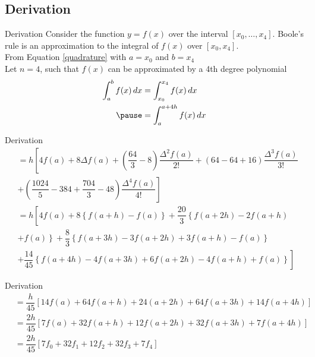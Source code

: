 \documentclass{beamer}
\begin{document}
\subsection{Derivation \cite{booles_quadrature}}

\begin{frame}{Derivation}
  Consider the function $y = f(x)$ over the interval $[x_0,\dots,x_4]$. Boole's rule is an approximation to the integral of $f(x)$ over $[x_0,x_4]$. \\ \pause 
  From Equation \ref{quadrature} with $a = x_0$ and $b = x_4$ \\ \pause 
  Let $n = 4$, such that $f(x)$ can be approximated by a 4th degree polynomial \\
  \begin{equation*}
    \begin{aligned}
      \int_a^b f(x) \mathop{dx} &= \int_{x_0}^{x_4} f(x) \mathop{dx} \\ \pause 
      &= \int_a^{a+4h} f(x) \mathop{dx}
    \end{aligned}
  \end{equation*}
\end{frame}

\begin{frame}{Derivation}
  \begin{equation*}
    \begin{aligned}
      &= h\left[4f(a) + 8\Delta f(a) + \left(\dfrac{64}{3} - 8\right)\dfrac{\Delta^2 f(a)}{2!} + \left(64 - 64 + 16\right)\dfrac{\Delta^3 f(a)}{3!} \right. \\ 
      &+ \left. \left(\dfrac{1024}{5} - 384 + \dfrac{704}{3} - 48\right)\dfrac{\Delta^4 f(a)}{4!}\right] \\
      &= h\left[4f(a) + 8\left\{f(a + h) - f(a)\right\} + \dfrac{20}{3}\left\{f(a + 2h) - 2f(a + h) \right. \right. \\ 
      &+ \left. f(a)\right\} + \dfrac{8}{3} \left\{f(a + 3h) - 3f(a + 2h) + 3f(a + h) - f(a)\right\} \\
      &+ \left. \dfrac{14}{45}\left\{f(a + 4h) - 4f(a + 3h) + 6f(a + 2h) - 4f(a + h) + f(a)\right\} \right] 
    \end{aligned}
  \end{equation*}
\end{frame}

\begin{frame}{Derivation}
  \begin{equation*}
    \begin{aligned}
      &= \dfrac{h}{45}\left[14f(a) + 64f(a + h) + 24(a + 2h) + 64f(a + 3h) + 14f(a + 4h)\right] \\
      &= \dfrac{2h}{45}\left[7f(a) + 32f(a + h) + 12f(a + 2h) + 32f(a + 3h) + 7f(a + 4h)\right] \\ 
      &= \dfrac{2h}{45}\left[7f_0 + 32f_1 + 12f_2 + 32f_3 + 7f_4\right]
    \end{aligned}
  \end{equation*}
\end{frame}
\end{document}
